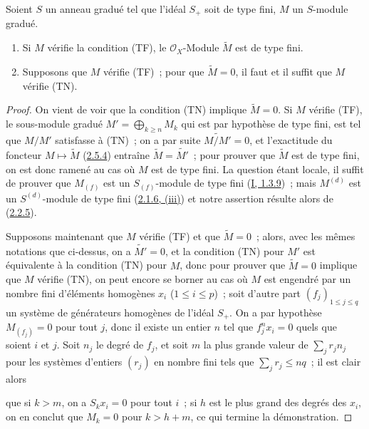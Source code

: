 \begin{proposition}[2.7.3]
\label{II.2.7.3-fr}
Soient $S$ un anneau gradué tel que l'idéal $S_+$ soit de type fini, $M$ un
$S$-module gradué.
\begin{enumerate}
  \item[\rm(i)] Si $M$ vérifie la condition (TF), le $\mathcal{O}_X$-Module
    $\widetilde{M}$ est de type fini.
  \item[\rm(ii)] Supposons que $M$ vérifie (TF)~; pour que $\widetilde{M}=0$,
    il faut et il suffit que $M$ vérifie (TN).
\end{enumerate}
\end{proposition}

\begin{proof}
On vient de voir que la condition (TN) implique $\widetilde{M}=0$. Si $M$
vérifie (TF), le sous-module gradué $M'=\bigoplus_{k\geq n}M_k$ qui est par
hypothèse de type fini, est tel que $M/M'$ satisfasse à (TN)~; on a par suite
$\widetilde{M/M'}=0$, et l'exactitude du foncteur
$M\mapsto\widetilde{M}$ (\hyperref[II.2.5.4-fr]{2.5.4}) entraîne
$\widetilde{M}=\widetilde{M'}$~; pour prouver que $\widetilde{M}$ est de type
fini, on est donc ramené au cas où $M$ est de type fini. La question étant
locale, il suffit de prouver que $M_{(f)}$ est un $S_{(f)}$-module de type
fini (\hyperref[I.1.3.9-fr]{I, 1.3.9})~; mais $M^{(d)}$ est un
$S^{(d)}$-module de type fini (\hyperref[II.2.1.6-fr]{2.1.6, (iii)}) et notre
assertion résulte alors de (\hyperref[II.2.2.5-fr]{2.2.5}).

Supposons maintenant que $M$ vérifie (TF) et que $\widetilde{M}=0$~; alors,
avec les mêmes notations que ci-dessus, on a $\widetilde{M'}=0$, et la
condition (TN) pour $M'$ est équivalente à la condition (TN) pour $M$, donc
pour prouver que $\widetilde{M}=0$ implique que $M$ vérifie (TN), on peut
encore se borner au cas où $M$ est engendré par un nombre fini d'éléments
homogènes $x_i$ ($1\leq i\leq p$)~; soit d'autre part
$(f_j)_{1\leq j\leq q}$ un système de générateurs homogènes de l'idéal $S_+$.
On a par hypothèse $M_{(f_j)}=0$ pour tout $j$, donc il existe un entier $n$
tel que $f_j^nx_i=0$ quels que soient $i$ et $j$. Soit $n_j$ le degré de
$f_j$, et soit $m$ la plus grande valeur de $\sum_jr_jn_j$ pour les systèmes
d'entiers $(r_j)$ en nombre fini tels que $\sum_jr_j\leq nq$~; il est clair
alors

que si $k>m$, on a $S_kx_i=0$ pour tout $i$~; si $h$ est le plus grand des
degrés des $x_i$, on en conclut que $M_k=0$ pour $k>h+m$, ce qui termine la
démonstration.
\end{proof}

